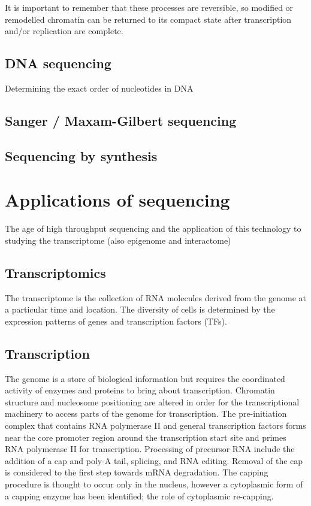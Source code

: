 It is important to remember that these processes are reversible, so modified or remodelled chromatin can be returned to its compact state after transcription and/or replication are complete.

\subsection{DNA sequencing}

Determining the exact order of nucleotides in DNA

\subsection{Sanger / Maxam-Gilbert sequencing}

\subsection{Sequencing by synthesis}

\section{Applications of sequencing}

The age of high throughput sequencing and the application of this technology to studying the transcriptome (also epigenome and interactome)

\subsection{Transcriptomics}

The transcriptome is the collection of RNA molecules derived from the genome at a particular time and location. The diversity of cells is determined by the expression patterns of genes and transcription factors (TFs).

\subsection{Transcription}

The genome is a store of biological information but requires the coordinated activity of enzymes and proteins to bring about transcription. Chromatin structure and nucleosome positioning are altered in order for the transcriptional machinery to access parts of the genome for transcription. The pre-initiation complex that contains RNA polymerase II and general transcription factors forms near the core promoter region around the transcription start site and primes RNA polymerase II for transcription. Processing of precursor RNA include the addition of a cap and poly-A tail, splicing, and RNA editing. Removal of the cap is considered to the first step towards mRNA degradation. The capping procedure is thought to occur only in the nucleus, however a cytoplasmic form of a capping enzyme has been identified; the role of cytoplasmic re-capping.

